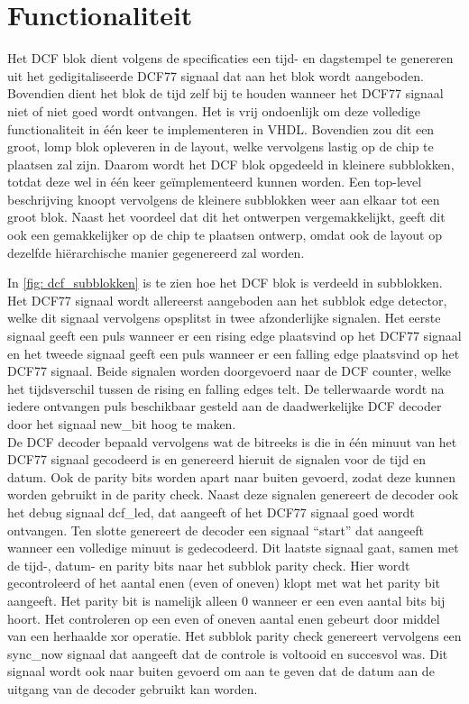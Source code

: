 \section{Functionaliteit}
Het DCF blok dient volgens de specificaties een tijd- en dagstempel te genereren uit het gedigitaliseerde DCF77 signaal dat aan het blok wordt aangeboden. Bovendien dient het blok de tijd zelf bij te houden wanneer het DCF77 signaal niet of niet goed wordt ontvangen. Het is vrij ondoenlijk om deze volledige functionaliteit in \'e\'en keer te implementeren in VHDL. Bovendien zou dit een groot, lomp blok opleveren in de layout, welke vervolgens lastig op de chip te plaatsen zal zijn. Daarom wordt het DCF blok opgedeeld in kleinere subblokken, totdat deze wel in \'e\'en keer geïmplementeerd kunnen worden. Een top-level beschrijving knoopt vervolgens de kleinere subblokken weer aan elkaar tot een groot blok. Naast het voordeel dat dit het ontwerpen vergemakkelijkt, geeft dit ook een gemakkelijker op de chip te plaatsen ontwerp, omdat ook de layout op dezelfde hi\"erarchische manier gegenereerd zal worden. \newpage

\noindent In \cref{fig: dcf_subblokken} is te zien hoe het DCF blok is verdeeld in subblokken. Het DCF77 signaal wordt allereerst aangeboden aan het subblok edge detector, welke dit signaal vervolgens opsplitst in twee afzonderlijke signalen. Het eerste signaal geeft een puls wanneer er een rising edge plaatsvind op het DCF77 signaal en het tweede signaal geeft een puls wanneer er een falling edge plaatsvind op het DCF77 signaal. Beide signalen worden doorgevoerd naar de DCF counter, welke het tijdsverschil tussen de rising en falling edges telt. De tellerwaarde wordt na iedere ontvangen puls beschikbaar gesteld aan de daadwerkelijke DCF decoder door het signaal new\_bit hoog te maken.\\

\noindent De DCF decoder bepaald vervolgens wat de bitreeks is die in \'e\'en minuut van het DCF77 signaal gecodeerd is en genereerd hieruit de signalen voor de tijd en datum. Ook de parity bits worden apart naar buiten gevoerd, zodat deze kunnen worden gebruikt in de parity check. Naast deze signalen genereert de decoder ook het debug signaal dcf\_led, dat aangeeft of het DCF77 signaal goed wordt ontvangen. Ten slotte genereert de decoder een signaal ``start'' dat aangeeft wanneer een volledige minuut is gedecodeerd. Dit laatste signaal gaat, samen met de tijd-, datum- en parity bits naar het subblok parity check. Hier wordt gecontroleerd of het aantal enen (even of oneven) klopt met wat het parity bit aangeeft. Het parity bit is namelijk alleen 0 wanneer er een even aantal bits bij hoort. Het controleren op een even of oneven aantal enen gebeurt door middel van een herhaalde xor operatie. Het subblok parity check genereert vervolgens een sync\_now signaal dat aangeeft dat de controle is voltooid en succesvol was. Dit signaal wordt ook naar buiten gevoerd om aan te geven dat de datum aan de uitgang van de decoder gebruikt kan worden.\\

